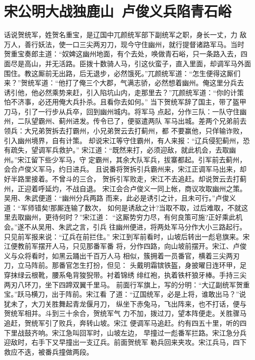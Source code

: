 \chapter{宋公明大战独鹿山~卢俊义兵陷青石峪}

话说贺统军，姓贺名重宝，是辽国中兀颜统军部下副统军之职，身长一丈，力
敌万人，善行妖法，使一口三尖两刃刀，现今守住幽州，就行提督诸路军马。当时
贺重宝奏郎主道：“奴婢这幽州地面，有个去处，唤做青石峪，只一条路入去，四
面尽是高山，并无活路。臣拨十数骑人马，引这伙蛮子，直入里面，却调军马外面
围住。教这厮前无出路，后无退步，必然饿死。”兀颜统军道：“怎生便得这厮们
来？”贺统军道：“他打了俺三个大郡，气满志骄，必然想着幽州。俺这里分兵去
诱引他，他必然乘势来赶，引入陷坑山内，走那里去？”兀颜统军道：“你的计策
怕不济事，必还用俺大兵扑杀。且看你去如何。”
当下贺统军辞了国主，带了盔甲刀马，引了一行步从兵卒，回到幽州城内。将军马
点起，分作三队：一队守住幽州，二队望霸州、蓟州进发。传令已了，便驱遣两队
军马出城。差两个兄弟前去领兵：大兄弟贺拆去打霸州，小兄弟贺云去打蓟州，都
不要赢他，只佯输诈败，引入幽州境界，自有计策。
却说宋江等守住霸州，有人来报：“辽兵侵犯蓟州，恐有疏失，望调军兵救护。”
宋江道：“既然来打，必须迎敌，就此机会，去取幽州。”宋江留下些少军马，守
定霸州，其余大队军兵，拔寨都起。引军前去蓟州，会合卢俊义军马，约日进兵。
且说番将贺拆引兵霸州来，宋江正调军马出来，却好半路里接着。不曾斗的三合，
贺拆引军败走，宋江不去追赶。却说贺云去打蓟州，正迎着呼延灼，不战自退。
宋江会合卢俊义一同上帐，商议攻取幽州之策。吴用、朱武便道：“幽州分兵两路
而来，此必是诱引之计，且未可行。”卢俊义道：“军师错矣!那厮连输了数次，
如何是诱敌之计?当取不取，过后难取，不就这里去取幽州，更待何时？”宋江道：
“这厮势穷力尽，有何良策可施?正好乘此机会。”遂不从吴用、朱武之言，引兵
往幽州便进，将两处军马分作大小三路起行。只见前军报来说：“辽兵在前拦住。”
宋江到军前看时，山坡后转出一彪皂旗来。宋江便教前军摆开人马，只见那番军番
将，分作四路，向山坡前摆开。宋江、卢俊义与众将看时，如黑云踊出千百万人马
相似，簇拥着一员番官，横着三尖两刃刀，立马阵前。那番官怎生打扮，但见：
头戴明霜镔铁盔，身披曜日连环甲，足穿抹绿云根靴，腰系龟背狻猊带。衬着锦绣
绯红袍，执着铁杆狼牙棒。手持三尖两刃八环刀，坐下四蹄双翼千里马。
前面行军旗上，写的分明：“大辽副统军贺重宝。”跃马横刀，出于阵前。宋江看
了道：“辽国统军，必是上将，谁敢出马？”说犹未了，大刀关胜舞起青龙偃月刀，
纵坐下赤兔马，飞出阵来，也不打话，便与贺统军相并。斗到三十余合，贺统军气
力不加，拨过刀，望本阵便走。关胜骤马追赶，贺统军引了败兵，奔转山坡。宋江
便调军马追赶。约有四五十里，听的四下里战鼓齐响。宋江急叫回军时，山坡左边，
早撞过一彪番军拦路。宋江急分兵迎敌时，右手下又早撞出一支辽兵。前面贺统军
勒兵回来夹攻。宋江兵马，四下救应不迭，被番兵撞做两段。
